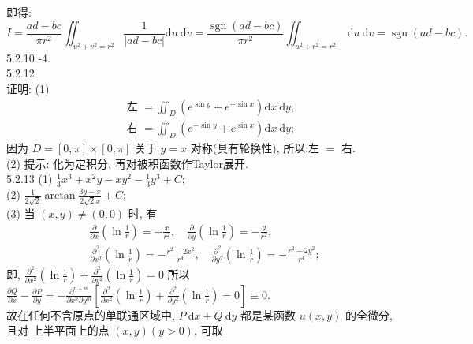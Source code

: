 \documentclass[a4paper,11pt,UTF8]{article}
\begin{document}
即得:
$$
I=\frac{a d-b c}{\pi r^2} \iint_{u^2+v^2=r^2} \frac{1}{|a d-b c|} \mathrm{d} u \mathrm{~d} v=\frac{\operatorname{sgn}(a d-b c)}{\pi r^2} \iint_{u^2+r^2=r^2} \mathrm{~d} u \mathrm{~d} v=\operatorname{sgn}(a d-b c) .
$$
5.2.10 -4.\\
5.2.12\\
证明: (1)\\
$$
\begin{aligned}
	& \text { 左 }=\iint_D\left(e^{\sin y}+e^{-\sin x}\right) \mathrm{d} x \mathrm{~d} y, \\
	& \text { 右 }=\iint_D\left(e^{-\sin y}+e^{\sin x}\right) \mathrm{d} x \mathrm{~d} y ;
\end{aligned}
$$
因为 $D=[0, \pi] \times[0, \pi]$ 关于 $y=x$ 对称(具有轮换性), 所以:左 $=$ 右.\\
(2) 提示: 化为定积分, 再对被积函数作Taylor展开.\\
5.2.13
(1) $\frac{1}{3} x^3+x^2 y-x y^2-\frac{1}{3} y^3+C$;\\
(2) $\frac{1}{2 \sqrt{2}} \arctan \frac{3 y-x}{2 \sqrt{2} x}+C$;\\
(3) 当 $(x, y) \neq(0,0)$ 时, 有
$$
\begin{array}{r}
	\frac{\partial}{\partial x}\left(\ln \frac{1}{r}\right)=-\frac{x}{r^2}, \quad \frac{\partial}{\partial y}\left(\ln \frac{1}{r}\right)=-\frac{y}{r^2}, \\
	\frac{\partial^2}{\partial x^2}\left(\ln \frac{1}{r}\right)=-\frac{r^2-2 x^2}{r^4}, \quad \frac{\partial^2}{\partial y^2}\left(\ln \frac{1}{r}\right)=-\frac{r^2-2 y^2}{r^4} ;
\end{array}
$$
即, $\frac{\partial^2}{\partial x^2}\left(\ln \frac{1}{r}\right)+\frac{\partial^2}{\partial y^2}\left(\ln \frac{1}{r}\right)=0$
所以 $\frac{\partial Q}{\partial x}-\frac{\partial P}{\partial y}=-\frac{\partial^{n+m}}{\partial x^n \partial y^m}\left[\frac{\partial^2}{\partial x^2}\left(\ln \frac{1}{r}\right)+\frac{\partial^2}{\partial y^2}\left(\ln \frac{1}{r}\right)=0\right] \equiv 0$.\\
故在任何不含原点的单联通区域中, $P \mathrm{~d} x+Q \mathrm{~d} y$ 都是某函数 $u(x, y)$ 的全微分, 且对 上半平面上的点 $(x, y)(y>0)$, 可取
\end{document}
